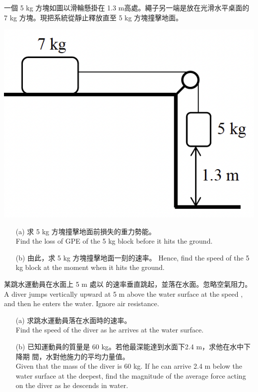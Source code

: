 \documentclass[beamer=true]{standalone}
\begin{document}
\begin{eg}
    一個 5 kg 方塊如圖以滑輪懸掛在 1.3 m高處。繩子另一端是放在光滑水平桌面的 7 kg 方塊。現把系統從靜止釋放直至 5 kg 方塊撞擊地面。
    {\par\centering
    \includegraphics[width=.35\textwidth]{assets/8a2c64de.png}
    \par}
\end{eg}

\begin{eg}
    \begin{itemize}
        \item[(a)] 求 5 kg 方塊撞擊地面前損失的重力勢能。 \\Find the loss of GPE of the 5 kg block before it hits the ground.
    \end{itemize}
\end{eg}

\begin{eg}
    \begin{itemize}
        \item [(b)] 由此，求 5 kg 方塊撞擊地面一刻的速率。 Hence, find the speed of the 5 kg block at the moment when it hits the ground.
    \end{itemize}
\end{eg}

\begin{eg}
    某跳水運動員在水面上 5 m 處以  的速率垂直跳起，並落在水面。忽略空氣阻力。 \\A diver jumps vertically upward at 5 m above the water surface at the speed , and then he enters the water. Ignore air resistance.
    \begin{itemize}
        \item [(a)] 求跳水運動員落在水面時的速率。 \\Find the speed of the diver as he arrives at the water surface.
    \end{itemize}
\end{eg}

\begin{eg}
    \begin{itemize}
        \item [(b)] 已知運動員的質量是 60 kg。若他最深能達到水面下2.4 m，求他在水中下降期 間，水對他施力的平均力量值。 \\Given that the mass of the diver is 60 kg. If he can arrive 2.4 m below the water surface at the deepest, find the magnitude of the average force acting on the diver as he descends in water.
    \end{itemize}
\end{eg}
\end{document}
